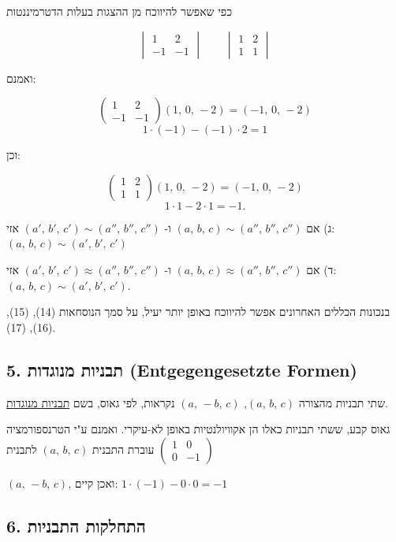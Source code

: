 כפי שאפשר להיווכח מן ההצגות בעלות הדטרמיננטות

\[
\begin{vmatrix} 1 & 2 \\ -1 & -1 \end{vmatrix}
\qquad
\begin{vmatrix} 1 & 2 \\ 1 & 1 \end{vmatrix}
\]

ואמנם:

\[
\begin{pmatrix} 1 & 2 \\ -1 & -1 \end{pmatrix}(1,\,0,\,-2) = (-1,\,0,\,-2)
\]
\[
1\cdot(-1) - (-1)\cdot 2 = 1
\]

וכן:

\[
\begin{pmatrix} 1 & 2 \\ 1 & 1 \end{pmatrix}(1,\,0,\,-2) = (-1,\,0,\,-2)
\]
\[
1\cdot 1 - 2\cdot 1 = -1 .
\]

\medskip
\noindent ג) אם $(a,\,b,\,c) \sim (a'',\,b'',\,c'')$ ו- $(a',\,b',\,c') \sim (a'',\,b'',\,c'')$ אזי: $(a,\,b,\,c) \sim (a',\,b',\,c')$

\medskip
\noindent ד) אם $(a,\,b,\,c) \approx (a'',\,b'',\,c'')$ ו- $(a',\,b',\,c') \approx (a'',\,b'',\,c'')$ אזי: $(a,\,b,\,c) \sim (a',\,b',\,c')$.

\medskip
בנכונות הכללים האחרונים אפשר להיווכח באופן יותר יעיל, על סמך הנוסחאות (14), (15), (16), (17).

\subsection*{5. תבניות מנוגדות (Entgegengesetzte Formen)}

שתי תבניות מהצורה $(a,\,b,\,c)$, $(a,\,-b,\,c)$ נקראות, לפי גאוס, בשם \underline{תבניות מנוגדות}.

\medskip
גאוס קבע, ששתי תבניות כאלו הן אקוויולנטיות באופן לא-עיקרי. ואמנם ע"י הטרנספורמציה $\begin{pmatrix}1 & 0\\ 0 & -1\end{pmatrix}$ עוברת התבנית $(a,\,b,\,c)$ לתבנית

$(a,\,-b,\,c)$, ואכן קיים: $1\cdot(-1) - 0\cdot 0 = -1$

\subsection*{6. התחלקות התבניות}


